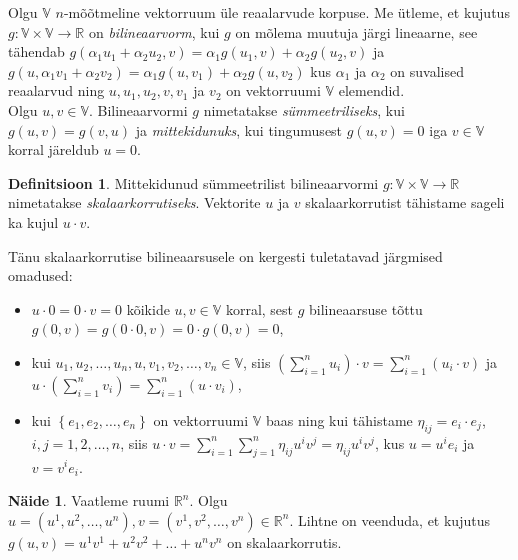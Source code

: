 \documentclass[a4paper,12pt]{article}
\theoremstyle{plain}
\theoremstyle{definition}
\newtheorem{definitsioon}{Definitsioon}[section]
\newtheorem{naide}{Näide}[section]
\numberwithin{equation}{section}
\begin{document}
Olgu $\mathbb{V}$ $n$-mõõtmeline vektorruum üle reaalarvude korpuse. Me ütleme, et kujutus $g : \mathbb{V} \times \mathbb{V} \rightarrow \mathbb{R}$ on \emph{bilineaarvorm}, kui $g$ on mõlema muutuja järgi lineaarne, see tähendab $g \left( \alpha_1 u_1 + \alpha_2 u_2, v \right) = \alpha_1 g \left( u_1, v \right) + \alpha_2 g \left( u_2, v \right)$ ja $g \left( u, \alpha_1 v_1 + \alpha_2 v_2 \right) = \alpha_1 g \left( u, v_1 \right) + \alpha_2 g \left( u, v_2 \right)$ kus $\alpha_1$ ja $\alpha_2$ on suvalised reaalarvud ning $u, u_1, u_2, v, v_1$ ja $v_2$ on vektorruumi $\mathbb{V}$ elemendid. 
\\
Olgu $u, v \in \mathbb{V}$. Bilineaarvormi $g$ nimetatakse \emph{sümmeetriliseks}, kui $g \left( u, v \right) = g \left(v, u \right)$ ja \emph{mittekidunuks}, kui tingumusest $g \left( u, v \right) = 0$ iga $v \in \mathbb{V}$ korral järeldub  $u = 0$.

\begin{definitsioon}
Mittekidunud sümmeetrilist bilineaarvormi $g: \mathbb{V} \times \mathbb{V} \rightarrow \mathbb{R}$ nimetatakse \emph{skalaarkorrutiseks}. Vektorite $u$ ja $v$ skalaarkorrutist tähistame sageli ka kujul $u \cdot v$.
\end{definitsioon}

Tänu skalaarkorrutise bilineaarsusele on kergesti tuletatavad järgmised omadused:
\begin{itemize}
\item $u \cdot 0 = 0 \cdot v = 0$ kõikide $u, v \in \mathbb{V}$ korral, sest $g$ bilineaarsuse tõttu $g \left(0, v\right) = g \left(0 \cdot 0, v \right) = 0 \cdot g \left(0, v \right) = 0$,
\item kui $u_1, u_2, \dots, u_n, u, v_1, v_2, \dots, v_n \in \mathbb{V}$, siis $\left( \sum_{i = 1}^{n} u_i \right) \cdot v = \sum_{i = 1}^{n}  \left( u_i \cdot v \right)$ ja $u \cdot \left( \sum_{i = 1}^{n} v_i \right) = \sum_{i = 1}^{n}  \left( u \cdot v_i \right)$,
\item kui $\left\lbrace e_1, e_2, \dots, e_n \right\rbrace$ on vektorruumi $\mathbb{V}$ baas ning kui tähistame $\eta_{ij} = e_i \cdot e_j$, $i,j = 1, 2, \dots, n$, siis $u \cdot v = \sum_{i = 1}^{n} \sum_{j = 1}^{n} \eta_{ij} u^i v^j = \eta_{ij} u^i v^j$, kus $u = u^i e_i$ ja $v = v^i e_i$.
\end{itemize}

\begin{naide}
Vaatleme ruumi $\mathbb{R}^{n}$. Olgu $u = \left(u^1, u^2, \dots, u^n \right), v = \left(v^1, v^2, \dots, v^n \right) \in \mathbb{R}^{n}$. Lihtne on veenduda, et kujutus $g \left(u, v \right) = u^1v^1 + u^2v^2 + \dots + u^n v^n$ on skalaarkorrutis.
\end{naide}
\end{document}
